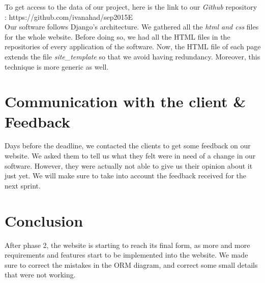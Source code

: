 \documentclass[a4paper, 12pt]{article}
\begin{document}
To get access to the data of our project, here is the link to our \textit{Github} repository : https://github.com/ivanahad/sep2015E\\ 

Our software follows Django's architecture. We gathered all the \textit{html and css} files for the whole website. Before doing so, we had all the HTML files in the repositories of every application of the software. Now, the HTML file of each page extends the file \textit{site\_template} so that we avoid having redundancy. Moreover, this technique is more generic as well. \\

\section{Communication with the client \& Feedback}
Days before the deadline, we contacted the clients to get some feedback on our website. We asked them to tell us what they felt were in need of a change in our software. However, they were actually not able to give us their opinion about it just yet. We will make sure to take into account the feedback received for the next sprint. \\

\section{Conclusion}
After phase 2, the website is starting to reach its final form, as more and more requirements and features start to be implemented into the website. We made sure to correct the mistakes in the ORM diagram, and correct some small details that were not working. 
\end{document}
